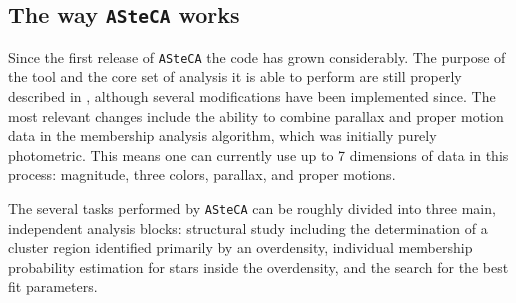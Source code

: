 \documentclass[draft]{aa}
\begin{document}







\subsection{The way \texttt{ASteCA} works}
\label{ssec:asteca_works}

Since the first release of \texttt{ASteCA} the code has grown
considerably. The purpose of the tool and the core set of analysis it is able
to perform are still properly described in \cite{Perren_2015}, although
several modifications have been implemented since. The most relevant changes
include the ability to combine parallax and proper motion data in the
membership analysis algorithm, which was initially purely photometric. This
means one can currently use up to 7 dimensions of data in this process:
magnitude, three colors, parallax, and proper motions.

The several tasks performed by \texttt{ASteCA} can be roughly divided into three
main, independent analysis blocks: structural study including the
determination of a cluster region identified primarily by an overdensity,
individual membership probability estimation for stars inside the overdensity,
and the search for the best fit parameters.\\
\end{document}

